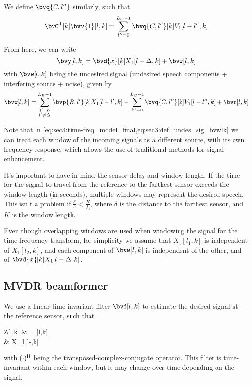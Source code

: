 We define $\bvq{C,l''}$ similarly, such that
\begin{equation}
	\tr{\bvC}[k] \bvv{1}[l,k] = \sum_{l''=0}^{L_C-1} \bvq{C,l''}[k] V_1[l-l'',k]
\end{equation}

From here, we can write
\begin{equation}
    \label{eq:sec3:time-freq_model_final}
	\bvy[l,k] = \bvd{x}[k] X_1[l-\Delta,k] + \bvw[l,k]
\end{equation}
with $\bvw[l,k]$ being the undesired signal (undesired speech components + interfering source + noise), given by
\begin{equation}
    \label{eq:sec3:def_undes_sig_bvwlk}
	\bvw[l,k] = \sum_{\substack{l'=0 \\ l' \neq \Delta}}^{L_B-1} \bvp{B,l'}[k] X_1[l-l',k] + \sum_{l''=0}^{L_C-1}\bvq{C,l''}[k] V_1[l-l'',k] + \bvr[l,k]
\end{equation}

Note that in \cref{eq:sec3:time-freq_model_final,eq:sec3:def_undes_sig_bvwlk} we can treat each window of the incoming signals as a different source, with its own frequency response, which allows the use of traditional methods for signal enhancement.

It's important to have in mind the sensor delay and window length. If the time for the signal to travel from the reference to the farthest sensor exceeds the window length (in seconds), multiple windows may represent the desired speech. This isn't a problem if $\frac{\delta}{c} < \frac{K}{f_s}$, where $\delta$ is the distance to the farthest sensor, and $K$ is the window length.

Even though overlapping windows are used when windowing the signal for the time-frequency transform, for simplicity we assume that $X_1[l_1,k]$ is independent of $X_1[l_2,k]$, and each component of $\bvw[l,k]$ is independent of the other, and of $\bvd{x}[k] X_1[l-\Delta,k]$.

\subsection{MVDR beamformer}

We use a linear time-invariant filter $\bvf[l,k]$ to estimate the desired signal at the reference sensor, such that
\begin{equations}
	Z[l,k]
	& = \he{\bvf}[l,k] \bvy[l,k] \\
	& \approx X_1[l-\Delta,k]
\end{equations}
with $(\cdot)^{\mathsf{H}}$ being the transposed-complex-conjugate operator. This filter is time-invariant within each window, but it may change over time depending on the signal.

